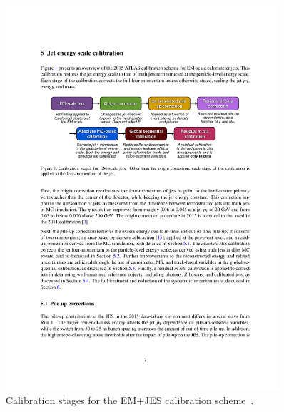 \begin{figure}[!htb]
  \begin{center}
    \includegraphics[width=0.9\textwidth]{figs/Objects/jets_calib_schem.pdf}
    \caption[Calibration stages for the EM+JES calibration scheme.]
            {Calibration stages for the EM+JES calibration scheme~\cite{obj-jets_calib_run2}.}
    \label{fig:obj-jets_calib_schem}
  \end{center}
  \vspace{-0.5cm}
\end{figure}

